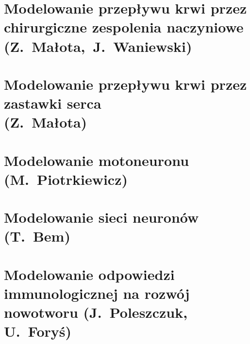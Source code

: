 \documentclass[11pt,a4paper,twoside,openright,draft]{memoir}
\begin{document}
			\chapter{Modelowanie przepływu krwi przez chirurgiczne zespolenia naczyniowe (Z.~Małota,~J.~Waniewski)}
			\chapter{Modelowanie przepływu krwi przez zastawki serca \\(Z.~Małota)}
			\chapter{Modelowanie motoneuronu (M.~Piotrkiewicz)}
			\chapter{Modelowanie sieci neuronów (T.~Bem)}
			\chapter{Modelowanie odpowiedzi immunologicznej na rozwój nowotworu (J.~Poleszczuk, U.~Foryś)}
	
			
			

	\backmatter
		
\end{document}
